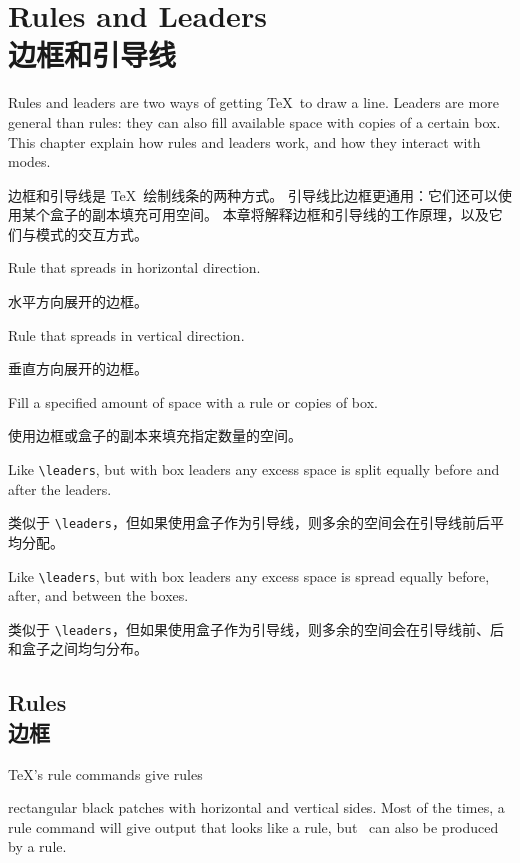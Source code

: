 
\chapter{Rules and Leaders\\边框和引导线}\label{rules}

Rules and leaders are two ways of getting \TeX\ to draw a line.
Leaders are more general than rules: they can also fill
available space with copies of a certain box. This chapter
explain how rules and leaders work, and how they interact with modes.

边框和引导线是 \TeX\ 绘制线条的两种方式。
引导线比边框更通用：它们还可以使用某个盒子的副本填充可用空间。
本章将解释边框和引导线的工作原理，以及它们与模式的交互方式。
\begin{inventory}
\item [\cs{hrule}] 
      Rule that spreads in horizontal direction.

      水平方向展开的边框。
\item [\cs{vrule}] 
      Rule that spreads in vertical direction.

      垂直方向展开的边框。
\item [\cs{leaders}] 
      Fill a specified amount of space with a rule or copies of box.

      使用边框或盒子的副本来填充指定数量的空间。
\item [\cs{cleaders}] 
      Like \verb=\leaders=, but with box leaders 
      any excess space is split equally before and after the leaders.

      类似于 \verb=\leaders=，但如果使用盒子作为引导线，则多余的空间会在引导线前后平均分配。
\item [\cs{xleaders}] 
      Like \verb=\leaders=, but with box leaders any excess space is 
      spread equally before, after, and between the boxes.

      类似于 \verb=\leaders=，但如果使用盒子作为引导线，则多余的空间会在引导线前、后和盒子之间均匀分布。
\end{inventory}

\section{Rules\\边框}

\TeX's rule commands give
\term rules\par
rectangular black patches with horizontal and vertical sides.
Most of the times, a rule command will give output that
looks like a rule, but~\hbox{\vrule height 1.5ex width 1.5ex}
can also be produced by a rule.

